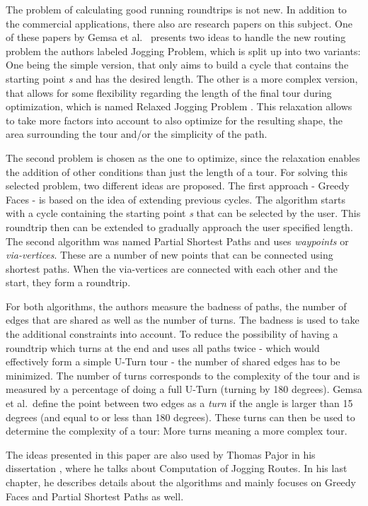 The problem of calculating good running roundtrips is not new.
In addition to the commercial applications, there also are research papers on this subject.
One of these papers by Gemsa et al.\ \cite{gemsa_efficient_2013} presents two ideas to handle the new routing problem the authors labeled \glqq Jogging Problem\grqq, which is split up into two variants: 
One being the simple version, that only aims to build a cycle that contains the starting point \textit{s} and has the desired length.
The other is a more complex version, that allows for some flexibility regarding the length of the final tour during optimization, which is named \glqq Relaxed Jogging Problem\grqq{} \cite{gemsa_efficient_2013}. 
This relaxation allows to take more factors into account to also optimize for the resulting shape, the area surrounding the tour and/or the simplicity of the path. 

The second problem is chosen as the one to optimize, since the relaxation enables the addition of other conditions than just the length of a tour.
For solving this selected problem, two different ideas are proposed.
The first approach - \glqq Greedy Faces\grqq{} - is based on the idea of extending previous cycles.
The algorithm starts with a cycle containing the starting point \textit{s} that can be selected by the user. 
This roundtrip then can be extended to gradually approach the user specified length. 
The second algorithm was named \glqq Partial Shortest Paths\grqq{} and uses \textit{waypoints} or \textit{via-vertices}.
These are a number of new points that can be connected using shortest paths.
When the via-vertices are connected with each other and the start, they form a roundtrip.


For both algorithms, the authors measure the badness of paths, the number of edges that are shared as well as the number of turns.
The badness is used to take the additional constraints into account. 
To reduce the possibility of having a roundtrip which turns at the end and uses all paths twice - which would effectively form a simple U-Turn tour - the number of shared edges has to be minimized.
The number of turns corresponds to the complexity of the tour and is measured by a percentage of doing a full U-Turn (turning by 180 degrees). 
Gemsa et al.\ define the point between two edges as a \textit{turn} if the angle is larger than 15 degrees (and equal to or less than 180 degrees).
These turns can then be used to determine the complexity of a tour:
More turns meaning a more complex tour.

The ideas presented in this paper are also used by Thomas Pajor in his dissertation \cite{pajor_algorithm_2013}, where he talks about Computation of Jogging Routes. In his last chapter, he describes details about the algorithms and mainly focuses on Greedy Faces and Partial Shortest Paths as well.

